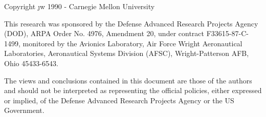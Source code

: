 \begin{center}
Copyright \j{w} 1990 - Carnegie Mellon University\end{center}

This research was sponsored by the Defense Advanced Research Projects
Agency (DOD), ARPA Order No. 4976, Amendment 20, under contract
F33615-87-C-1499,
monitored by the Avionics Laboratory, Air Force Wright Aeronautical
Laboratories, Aeronautical Systems Division (AFSC), Wright-Patterson AFB,
Ohio 45433-6543.

The views and conclusions contained in this document are
those of the authors and should not be interpreted as representing the
official policies, either expressed or implied, of the Defense Advanced
Research Projects Agency or the US Government.
